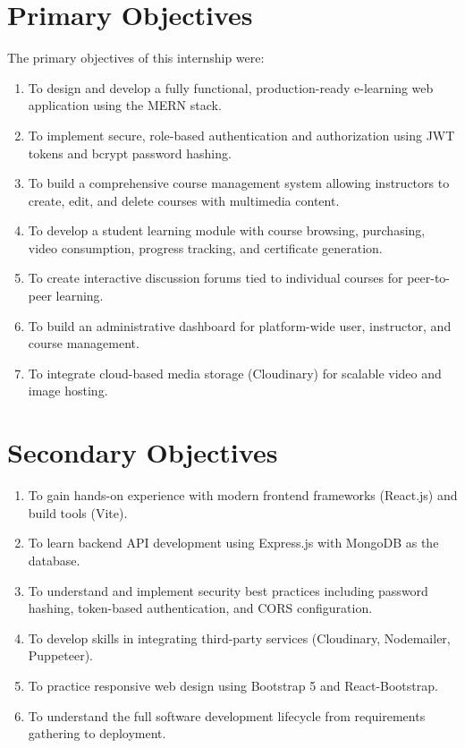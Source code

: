 \documentclass[12pt,a4paper]{report}
\begin{document}
\section{Primary Objectives}
The primary objectives of this internship were:
\begin{enumerate}[label=\arabic*.]
    \item To design and develop a fully functional, production-ready e-learning web application using the MERN stack.
    \item To implement secure, role-based authentication and authorization using JWT tokens and bcrypt password hashing.
    \item To build a comprehensive course management system allowing instructors to create, edit, and delete courses with multimedia content.
    \item To develop a student learning module with course browsing, purchasing, video consumption, progress tracking, and certificate generation.
    \item To create interactive discussion forums tied to individual courses for peer-to-peer learning.
    \item To build an administrative dashboard for platform-wide user, instructor, and course management.
    \item To integrate cloud-based media storage (Cloudinary) for scalable video and image hosting.
\end{enumerate}

\section{Secondary Objectives}
\begin{enumerate}[label=\arabic*.]
    \item To gain hands-on experience with modern frontend frameworks (React.js) and build tools (Vite).
    \item To learn backend API development using Express.js with MongoDB as the database.
    \item To understand and implement security best practices including password hashing, token-based authentication, and CORS configuration.
    \item To develop skills in integrating third-party services (Cloudinary, Nodemailer, Puppeteer).
    \item To practice responsive web design using Bootstrap 5 and React-Bootstrap.
    \item To understand the full software development lifecycle from requirements gathering to deployment.
\end{enumerate}
\end{document}
